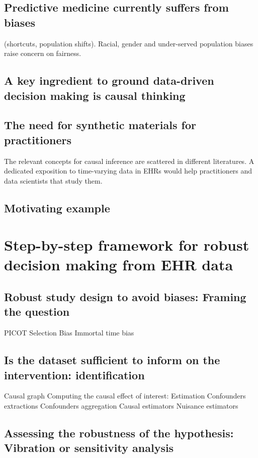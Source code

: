 \documentclass{report}
\begin{document}
\subsection{Predictive medicine currently suffers from biases}\label{subsec:causal_tuto:predictive_medicine_biases}
(shortcuts, population shifts). Racial, gender and under-served population biases raise concern on fairness.
\subsection{A key ingredient to ground data-driven decision making is causal thinking}

\subsection{The need for synthetic materials for practitioners}\label{subsec:causal_tuto:synthetic_materials}

The relevant concepts for causal inference are scattered in different literatures. A dedicated exposition to time-varying data in EHRs would help practitioners and data scientists that study them.
\subsection{Motivating example}\label{subsec:causal_tuto:motivating_example}


\section{Step-by-step framework for robust decision making from EHR data}\label{sec:causal_tuto:framework}

\subsection{Robust study design to avoid biases: Framing the question}
PICOT
Selection Bias
Immortal time bias

\subsection{Is the dataset sufficient to inform on the intervention: identification}
Causal graph Computing the causal effect of interest: Estimation Confounders
extractions Confounders aggregation Causal estimators Nuisance estimators
\subsection{Assessing the robustness of the hypothesis: Vibration or sensitivity
  analysis}\label{subsec:causal_tuto:vibration_analysis}
\end{document}
